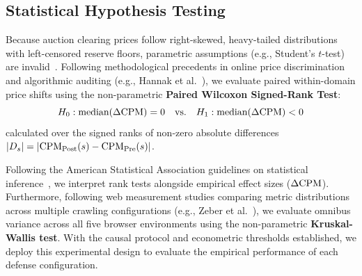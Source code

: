 \subsection{Statistical Hypothesis Testing}
\label{subsec:stats}

Because auction clearing prices follow right-skewed, heavy-tailed distributions with left-censored reserve floors, parametric assumptions (e.g., Student's $t$-test) are invalid~\cite{barysei2023investigating}. 
Following methodological precedents in online price discrimination and algorithmic auditing (e.g., Hannak et al.~\cite{hannak2014ecommerce}), we evaluate paired within-domain price shifts using the non-parametric \textbf{Paired Wilcoxon Signed-Rank Test}:
\begin{equation}
H_0: \text{median}(\Delta\text{CPM}) = 0 \quad \text{vs.} \quad H_1: \text{median}(\Delta\text{CPM}) < 0
\end{equation}
calculated over the signed ranks of non-zero absolute differences $|D_s| = |\text{CPM}_{\text{Post}}(s) - \text{CPM}_{\text{Pre}}(s)|$. 

Following the American Statistical Association guidelines on statistical inference~\cite{wasserstein2016asa}, we interpret rank tests alongside empirical effect sizes ($\Delta\text{CPM}$). 
Furthermore, following web measurement studies comparing metric distributions across multiple crawling configurations (e.g., Zeber et al.~\cite{zeber2020representativeness}), we evaluate omnibus variance across all five browser environments using the non-parametric \textbf{Kruskal-Wallis test}. 
With the causal protocol and econometric thresholds established, we deploy this experimental design to evaluate the empirical performance of each defense configuration.